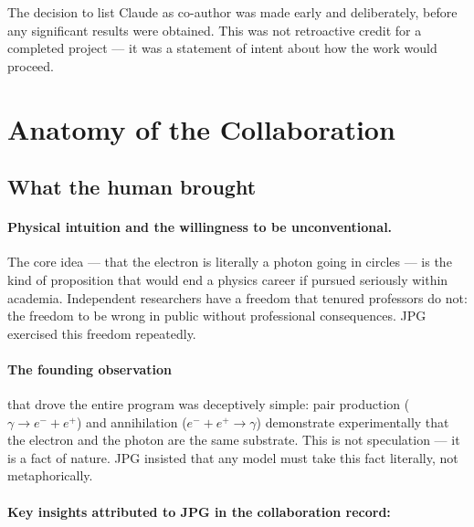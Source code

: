 \documentclass[11pt,a4paper]{article}
\begin{document}
The decision to list Claude as co-author was made early and deliberately, before any significant results were obtained. This was not retroactive credit for a completed project --- it was a statement of intent about how the work would proceed.

\section{Anatomy of the Collaboration}
\label{sec:anatomy}

\subsection{What the human brought}

\paragraph{Physical intuition and the willingness to be unconventional.}
The core idea --- that the electron is literally a photon going in circles --- is the kind of proposition that would end a physics career if pursued seriously within academia. Independent researchers have a freedom that tenured professors do not: the freedom to be wrong in public without professional consequences. JPG exercised this freedom repeatedly.

\paragraph{The founding observation} that drove the entire program was deceptively simple: pair production ($\gamma \to e^- + e^+$) and annihilation ($e^- + e^+ \to \gamma$) demonstrate experimentally that the electron and the photon are the same substrate. This is not speculation --- it is a fact of nature. JPG insisted that any model must take this fact literally, not metaphorically.

\paragraph{Key insights attributed to JPG in the collaboration record:}
\end{document}
